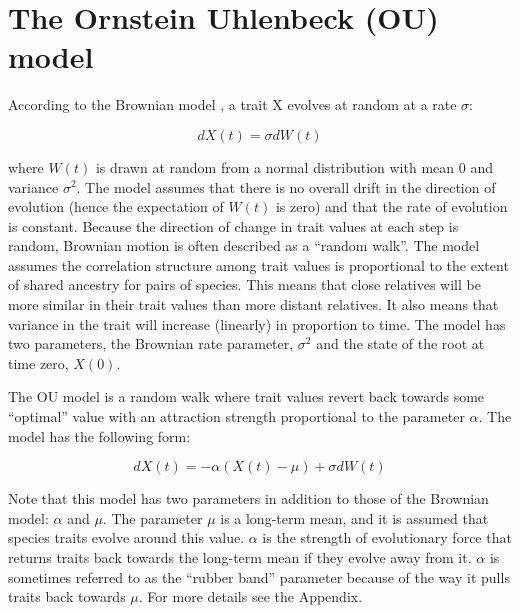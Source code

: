\documentclass[a4paper,12pt]{article}
\begin{document}
\section{The Ornstein Uhlenbeck (OU) model}
  
  According to the Brownian model \citep{cavalli1967,felsenstein1973maximum}, a trait X evolves at random at a rate $\sigma$:

      \begin{equation}
        dX(t) = \sigma dW(t)
      \end{equation}
    
    \noindent
    where $W(t)$ is drawn at random from a normal distribution with mean $0$ and variance $\sigma^2$. 
    The model assumes that there is no overall drift in the direction of evolution (hence the expectation of $W(t)$ is zero) and that the rate of evolution is constant. 
    Because the direction of change in trait values at each step is random, Brownian motion is often described as a ``random walk''.
    The model assumes the correlation structure among trait values is proportional to the extent of shared ancestry for pairs of species. 
    This means that close relatives will be more similar in their trait values than more distant relatives. It also means that variance in the trait will increase (linearly) in proportion to time. 
    The model has two parameters, the Brownian rate parameter, $\sigma^2$ and the state of the root at time zero, $X(0)$. 

   The OU model \citep{hansen1997stabilizing,Butler:2004aa} is a random walk where trait values revert back towards some ``optimal'' value with an attraction strength proportional to the parameter $\alpha$. 
    The model has the following form:
  
      \begin{equation}
        dX(t) = - \alpha (X(t) - \mu) + \sigma dW(t)
      \end{equation}
    
    \noindent
    Note that this model has two parameters in addition to those of the Brownian model: $\alpha$ and $\mu$. 
    The parameter $\mu$ is a long-term mean, and it is assumed that species traits evolve around this value. 
    $\alpha$ is the strength of evolutionary force that returns traits back towards the long-term mean if they evolve away from it. 
    $\alpha$ is sometimes referred to as the ``rubber band'' parameter because of the way it pulls traits back towards $\mu$. For more details see the Appendix.
    
\end{document}
